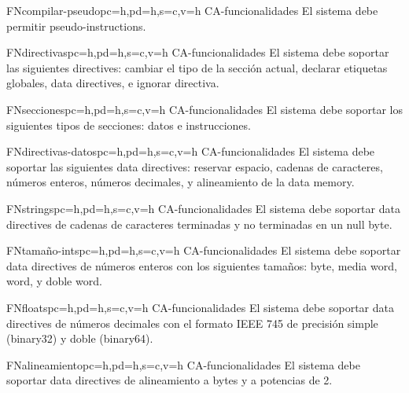 \begin{softwareReq}{FN}{compilar-pseudo}{pc=h,pd=h,s=c,v=h}
    {CA-funcionalidades}
    El sistema debe permitir  \glspl{pseudo-instruction}.
\end{softwareReq}

\begin{softwareReq}{FN}{directivas}{pc=h,pd=h,s=c,v=h}
    {CA-funcionalidades}
    El sistema debe soportar las siguientes \glspl{directive}: cambiar el tipo
    de la sección actual, declarar etiquetas globales, \glspl{data directive}, e
    ignorar directiva.
\end{softwareReq}

\begin{softwareReq}{FN}{secciones}{pc=h,pd=h,s=c,v=h}
    {CA-funcionalidades}
    El sistema debe soportar los siguientes tipos de secciones: datos e
    instrucciones.
\end{softwareReq}

\begin{softwareReq}{FN}{directivas-datos}{pc=h,pd=h,s=c,v=h}
    {CA-funcionalidades}
    El sistema debe soportar las siguientes \glspl{data directive}: reservar
    espacio, cadenas de caracteres, números enteros, números decimales, y
    alineamiento de la \gls{data memory}.
\end{softwareReq}

\begin{softwareReq}{FN}{strings}{pc=h,pd=h,s=c,v=h}
    {CA-funcionalidades}
    El sistema debe soportar \glspl{data directive} de cadenas de
    caracteres terminadas y no terminadas en un \gls{null byte}.
\end{softwareReq}

\begin{softwareReq}{FN}{tamaño-ints}{pc=h,pd=h,s=c,v=h}
    {CA-funcionalidades}
    El sistema debe soportar \glspl{data directive} de números enteros con los
    siguientes tamaños: byte, media \gls{word}, \gls{word}, y doble \gls{word}.
\end{softwareReq}

\begin{softwareReq}{FN}{floats}{pc=h,pd=h,s=c,v=h}
    {CA-funcionalidades}
    El sistema debe soportar \glspl{data directive} de números decimales con el
    formato IEEE 745 \parencite{FloatsIEEE} de precisión simple (binary32) y
    doble (binary64).
\end{softwareReq}

\begin{softwareReq}{FN}{alineamiento}{pc=h,pd=h,s=c,v=h}
    {CA-funcionalidades}
    El sistema debe soportar \glspl{data directive} de alineamiento a bytes y a
    potencias de 2.
\end{softwareReq}

